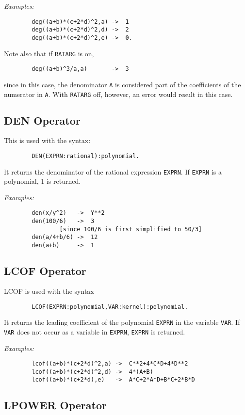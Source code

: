 {\it Examples:}
\begin{verbatim}
        deg((a+b)*(c+2*d)^2,a) ->  1
        deg((a+b)*(c+2*d)^2,d) ->  2
        deg((a+b)*(c+2*d)^2,e) ->  0.
\end{verbatim}
Note also that if {\tt RATARG} is on,
\begin{verbatim}
        deg((a+b)^3/a,a)       ->  3
\end{verbatim}
since in this case, the denominator {\tt A} is considered part of the
coefficients of the numerator in {\tt A}.  With {\tt RATARG} off, however,
an error would result in this case.

\subsection{DEN Operator}

This is used with the syntax:
\begin{verbatim}
        DEN(EXPRN:rational):polynomial.
\end{verbatim}
It returns the denominator of the rational expression {\tt EXPRN}.  If
{\tt EXPRN} is a polynomial, 1 is returned.

{\it Examples:}
\begin{verbatim}
        den(x/y^2)   ->  Y**2
        den(100/6)   ->  3
                [since 100/6 is first simplified to 50/3]
        den(a/4+b/6) ->  12
        den(a+b)     ->  1
\end{verbatim}

\subsection{LCOF Operator}

LCOF is used with the syntax
\begin{verbatim}
        LCOF(EXPRN:polynomial,VAR:kernel):polynomial.
\end{verbatim}
It returns the leading coefficient of the
polynomial {\tt EXPRN} in the variable {\tt VAR}.  If {\tt VAR} does not
occur as a variable in {\tt EXPRN}, {\tt EXPRN} is returned.

{\it Examples:}
\begin{verbatim}
        lcof((a+b)*(c+2*d)^2,a) ->  C**2+4*C*D+4*D**2
        lcof((a+b)*(c+2*d)^2,d) ->  4*(A+B)
        lcof((a+b)*(c+2*d),e)   ->  A*C+2*A*D+B*C+2*B*D
\end{verbatim}

\subsection{LPOWER Operator}

